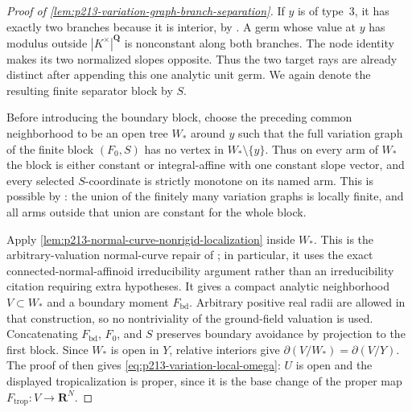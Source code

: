 \begin{proof}[Proof of
\cref{lem:p213-variation-graph-branch-separation}]
If $y$ is of type~$3$, it has exactly two branches because it is interior,
by \cite[§4.2.11.2]{Ducros24CurveStructure}.  A germ whose value at
$y$ has modulus outside $|K^\times|^{\mathbf Q}$ is nonconstant along
both branches.  The node identity
\cite[Theorem~4.5.22]{Ducros24CurveStructure} makes its two normalized
slopes opposite.  Thus the two target rays are already distinct after
appending this one analytic unit germ.  We again denote the resulting
finite separator block by $S$.

Before introducing the boundary block, choose the preceding common
neighborhood to be an open tree $W_*$ around $y$ such that the full
variation graph of the finite block $(F_0,S)$ has no vertex in
$W_*\setminus\{y\}$.  Thus on every arm of $W_* $ the block is either
constant or integral-affine with one constant slope vector, and every
selected $S$-coordinate is strictly monotone on its named arm.  This is
possible by \cite[Theorem~3.5.1 and
§§4.5.21.1--4.5.21.2]{Ducros24CurveStructure}: the union of the finitely
many variation graphs is locally finite, and all arms outside that union
are constant for the whole block.

Apply
\cref{lem:p213-normal-curve-nonrigid-localization} inside $W_*$.  This is
the arbitrary-valuation normal-curve repair of
\cite[Lemma~12.3.6]{CLD25}; in particular, it uses the exact
connected-normal-affinoid irreducibility argument rather than an
irreducibility citation requiring extra hypotheses.  It gives a compact
analytic neighborhood $V\subset W_*$ and a boundary moment
$F_{\mathrm{bd}}$.  Arbitrary positive real radii are allowed in that
construction, so no nontriviality of the ground-field valuation is used.
Concatenating
$F_{\mathrm{bd}}$, $F_0$, and $S$ preserves boundary avoidance by
projection to the first block.  Since $W_*$ is open in $Y$, relative
interiors give $\partial(V/W_*)=\partial(V/Y)$.  The proof of
\cite[Theorem~16.8.5]{CLD25} then gives
\eqref{eq:p213-variation-local-omega}: $U$ is open and the displayed
tropicalization is proper, since it is the base change of the proper map
$F_{\mathrm{trop}}:V\to\mathbf R^N$.


\end{proof}
